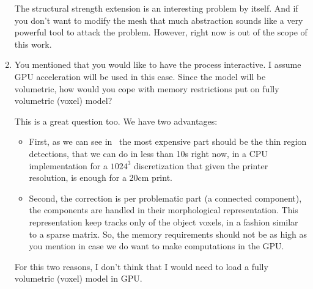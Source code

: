\begin{enumerate}
	The structural strength extension is an interesting problem by itself. And if you don't want to modify the mesh that much abstraction sounds like a very powerful tool to attack the problem. However, right now is out of the scope of this work.
	
	\item You mentioned that you would like to have the process interactive. I assume GPU acceleration will be used in this case. Since the model will be volumetric, how would you cope with memory restrictions put on fully volumetric (voxel) model?
	
	This is a great question too. We have two advantages:
	
\begin{itemize}
	\item First, as we can see in~\cite{Telea2011} the most expensive part should be the thin region detections, that we can do in less than 10s right now, in a CPU implementation for a $1024^3$ discretization that given the printer resolution, is enough for a 20cm print.
	
	\item Second, the correction is per problematic part (a connected component), the components are handled in their morphological representation. This representation keep tracks only of the object voxels, in a fashion similar to a sparse matrix. So, the memory requirements should not be as high as you mention in case we do want to make computations in the GPU.
\end{itemize}
	
	For this two reasons, I don't think that I would need to load a fully volumetric (voxel) model in GPU.
\end{enumerate}